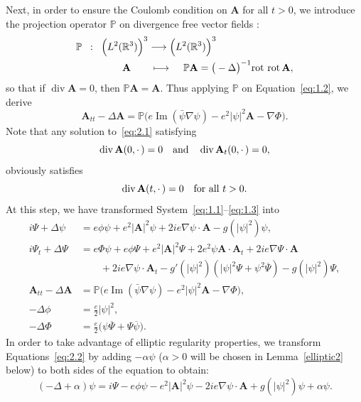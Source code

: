 \documentclass[AHL,Unicode,longabstracts]{cedram}
\newcommand{\BA}{\mathbf{A}}
\newcommand{\R}{\mathbb{R}}
\DeclareMathOperator{\IM}{Im}
\DeclareMathOperator{\Div}{div}
\begin{document}
Next, in order to ensure the Coulomb condition on $\BA$ for all $t>0$, we introduce the projection operator ${\mathbb P}$ on divergence free vector fields :
\begin{align*}
{\mathbb P} \;\; : \;\; \Big(L^2(&\R^3)\Big)^3 \longrightarrow \Big(L^2(\R^3)\Big)^3\\
&\BA\hspace{7mm}\longmapsto \hspace{4mm} {\mathbb P}\BA= \big(-\Delta\big)^{-1} \text{rot rot} \, \BA,
\end{align*}
so that if $\Div\BA=0$, then ${\mathbb P}\BA =\BA$. Thus applying ${\mathbb P}$ on Equation~\eqref{eq:1.2}, we derive
\begin{equation}\label{eq:2.1}
\BA_{tt}-\Delta \BA = {\mathbb P} \Big(e \IM (\bar{\psi} \nabla \psi)-e^2|\psi|^2 \BA -\nabla \Phi \Big).
\end{equation}
Note that any solution to~\eqref{eq:2.1} satisfying
\[
\Div\BA(0,{\cdot\,})=0 \quad \hbox{and} \quad
\Div\BA_t (0,{\cdot\,})=0,
\]
obviously satisfies
\[
\Div\BA(t,{\cdot\,})=0 \quad \hbox{for all} \ t>0.
\]
At this step, we have transformed System~\eqref{eq:1.1}--\eqref{eq:1.3} into
\begin{align}
i\Psi +\Delta \psi &= e\phi \psi +e^2 |\BA|^2 \psi + 2 ie \nabla \psi\cdot \BA -g(|\psi|^2)\psi, \label{eq:2.2}
\\
i\Psi_t +\Delta \Psi &= e \Phi \psi +e \phi \Psi +e^2 |\BA|^2 \Psi + 2e^2 \psi \BA \cdot \BA_t +2i e \nabla \Psi \cdot \BA \label{eq:2.3} \\
\nonumber& \qquad  +2i e \nabla \psi \cdot \BA_t -g'(|\psi|^2)(|\psi|^2\Psi+\psi^2\overline{\Psi}) - g(|\psi|^2)\Psi,
\\
\BA_{tt}-\Delta \BA &={\mathbb P} \Big(e \IM (\bar{\psi} \nabla \psi)-e^2|\psi|^2 \BA -\nabla \Phi \Big),\label{eq:2.4}
\\
-\Delta \phi &=\frac{e}{2} |\psi|^2, \label{eq:2.5}
\\
-\Delta \Phi &=\frac{e}{2} \big(\psi \overline{\Psi}+\Psi \overline{\psi}\big).\label{eq:2.6}
\end{align}
In order to take advantage of elliptic regularity properties, we transform Equations~\eqref{eq:2.2} by adding $-\alpha \psi$ ($\alpha>0$ will be chosen in Lemma~\ref{elliptic2} below) to both sides of the equation to obtain:
\begin{equation}\label{eq:2.7}
(-\Delta +\alpha)\psi = i \Psi -e\phi \psi -e^2 |\BA|^2 \psi - 2 ie \nabla \psi\cdot \BA +g(|\psi|^2)\psi+\alpha \psi.
\end{equation}
\end{document}
